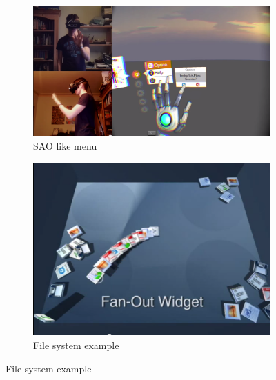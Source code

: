 \documentclass[paper=a4, fontsize=11pt]{scrartcl} %
\numberwithin{equation}{section} %
\numberwithin{figure}{section} %
\numberwithin{table}{section} %
\begin{document}
\begin{figure}
\centering
\begin{subfigure}[c]{0.4\textwidth}
\includegraphics[width=1\textwidth]{sao.png}
\caption{\label{fig:frog}SAO like menu}
\end{subfigure}%
\qquad%
\begin{subfigure}[c]{0.4\textwidth}
\centering
\includegraphics[width=1\textwidth]{fs.png}
\caption{\label{fig:frog}File system example}
\end{subfigure}
\end{figure}



\end{document}
